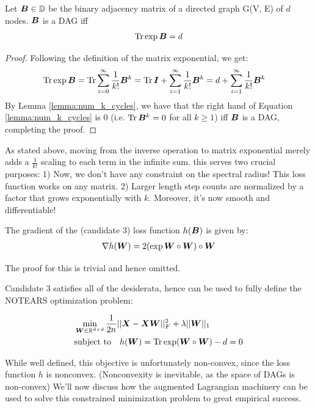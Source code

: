 \documentclass[11pt,a4paper]{article}
\begin{document}
\begin{lemma}
     Let ${\bm{B}} \in \mathbb{D}$ be the binary adjacency matrix of a directed graph G(V, E) of $d$ nodes. ${\bm{B}}$ is a DAG iff 
     \begin{align}
         \operatorname{Tr} \exp {\bm{B}} = d
     \end{align}
\end{lemma}
\begin{proof}
    Following the definition of the matrix exponential, we get:
    \begin{align}
        \operatorname{Tr} \exp {\bm{B}} &= \operatorname{Tr} \sum_{i=0}^{\infty} \frac{1}{k!} {\bm{B}}^k
        = \operatorname{Tr} {\bm{I}} + \sum_{i=1}^{\infty} \frac{1}{k!} {\bm{B}}^k  = d + \sum_{i=1}^{\infty} \frac{1}{k!} {\bm{B}}^k \label{eq:exp_cycle}
    \end{align}
    By Lemma \ref{lemma:num_k_cycles}, we have that the right hand of Equation \ref{lemma:num_k_cycles} is $0$ (i.e. $\operatorname{Tr} {\bm{B}}^k=0$ for all $k \geq 1$) iff ${\bm{B}}$ is a DAG, completing the proof. 
\end{proof}

As stated above, moving from the inverse operation to matrix exponential merely adds a $\frac{1}{k!}$ scaling to each term in the infinite sum. this serves two crucial purposes: 1) Now, we don't have any constraint on the spectral radius! This loss function works on any matrix. 2) Larger length step counts are normalized by a factor that grows exponentially with $k$. Moreover, it's now smooth and differentiable!
\begin{lemma}
    The gradient of the (candidate 3) loss function $h({\bm{B}})$ is given by:
    \begin{align}
        \nabla h({\bm{W}}) = 2(\exp {\bm{W}} \circ {\bm{W}}) \circ {\bm{W}}
    \end{align}
\end{lemma}
The proof for this is trivial and hence omitted. 

Candidate 3 satisfies all of the desiderata, hence can be used to fully define the NOTEARS optimization problem:

\begin{align}
    &\min_{{\bm{W}} \in \mathbb{R}^{d \times d}} \frac{1}{2n} ||{\bm{X}} - {\bm{X}} {\bm{W}}||_{F}^{2} + \lambda ||{\bm{W}}||_1 \\
    &\text{subject to} \quad h({\bm{W}}) = \operatorname{Tr} \exp ({\bm{W}} \circ  {\bm{W}}) - d = 0
\end{align}

While well defined, this objective is unfortunately non-convex, since the loss function $h$ is nonconvex. (Nonconvexity is inevitable, as the space of DAGs is non-convex) We'll now discuss how the augmented Lagrangian machinery can be used to solve this constrained minimization problem to great empirical success. 
\end{document}
